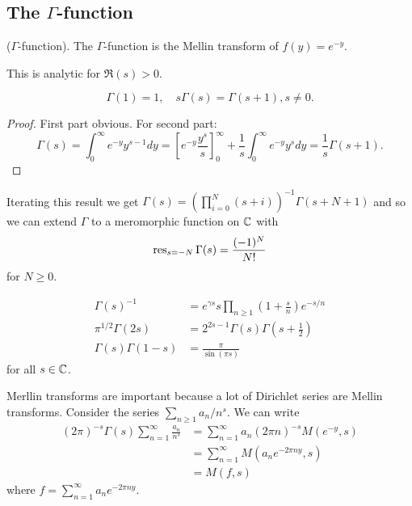 \documentclass{memoir}
\begin{document}
\subsection{The $\Gamma$-function}
\begin{definition}
    ($\Gamma$-function). 
    The $\Gamma$-function is the Mellin transform of $f(y) = e^{-y}$.
\end{definition}
This is analytic for $\Re(s)>0$.
\begin{proposition}
    \begin{equation}
        \Gamma(1) = 1, \quad s\Gamma(s) = \Gamma(s+1), s\ne 0.
    \end{equation}
\end{proposition}
\begin{proof}
    First part obvious.
    For second part:
    \begin{equation}
        \Gamma(s) = \int_0^\infty e^{-y}y^{s-1}dy = \left[e^{-y}\frac{y^s}s\right]_0^\infty + \frac1s\int_0^\infty e^{-y}y^sdy = \frac1s\Gamma(s+1).
    \end{equation}
\end{proof}
Iterating this result we get $\Gamma(s) = \left(\prod_{i=0}^N(s+i)\right)^{-1}\Gamma(s+N+1)$ and so we can extend $\Gamma$ to a meromorphic function on $\mathbb{C}$ with
\begin{equation}
    \operatorname{res}_{s = -N} \Gamma(s) = \frac{(-1)^{N}}{N!}
\end{equation}
for $N\ge0$.
\begin{proposition}
    \begin{align}
        \Gamma(s)^{-1} &= e^{\gamma s}s\prod_{n\ge 1} \left(1+\frac sn\right)e^{-s/n} \\
        \pi^{1/2}\Gamma(2s) &= 2^{2s-1}\Gamma(s)\Gamma\left(s+\frac12\right) \\
        \Gamma(s)\Gamma(1-s) &= \frac{\pi}{\sin(\pi s)}
    \end{align}
    for all $s\in \mathbb{C}$.
\end{proposition}
\begin{remark}
    Merllin transforms are important because a lot of Dirichlet series are Mellin transforms. Consider the series $\sum_{n\ge1}a_n/n^s$.
    We can write
    \begin{align}
        (2\pi)^{-s} \Gamma(s) \sum_{n=1}^\infty\frac{a_n}{n^s} &= \sum_{n=1}^\infty a_n(2\pi n)^{-s} M(e^{-y},s) \nonumber \\
                                                               &= \sum_{n=1}^\infty M(a_n e^{-2\pi ny},s) \nonumber \\
                                                               &= M(f,s)
    \end{align}
    where $f = \sum_{n=1}^\infty a_ne^{-2\pi ny}$.
\end{remark}
\end{document}

